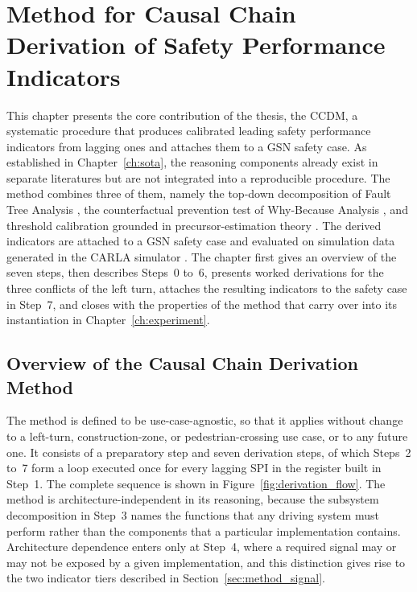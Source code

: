 \chapter[Causal Chain Derivation Method]{Method for Causal Chain Derivation of Safety Performance Indicators}
\label{ch:methodology}

This chapter presents the core contribution of the thesis, the \ac{CCDM}, a systematic
procedure that produces calibrated leading safety performance indicators
from lagging ones and attaches them to a \ac{GSN} safety case. As established in
Chapter~\ref{ch:sota}, the reasoning components already exist in separate literatures
but are not integrated into a reproducible procedure. The method combines three of
them, namely the top-down decomposition of Fault Tree Analysis \cite{iec61025}, the
counterfactual prevention test of Why-Because Analysis \cite{ladkin1998}, and
threshold calibration grounded in precursor-estimation theory \cite{bieryi1995}. The
derived indicators are attached to a \ac{GSN} safety case and evaluated on
simulation data generated in the CARLA simulator \cite{dosovitskiy2017carla}. The chapter first gives
an overview of the seven steps, then describes Steps~0 to~6, presents worked
derivations for the three conflicts of the left turn, attaches the resulting
indicators to the safety case in Step~7, and closes with the properties of the
method that carry over into its instantiation in Chapter~\ref{ch:experiment}.

\section{Overview of the Causal Chain Derivation Method}
\label{sec:method_overview}

The method is defined to be use-case-agnostic, so that it applies without change to a
left-turn, construction-zone, or pedestrian-crossing use case, or to any future one.
It consists of a preparatory step and seven derivation steps, of which
Steps~2 to~7 form a loop executed once for every lagging SPI in the register
built in Step~1. The complete sequence is shown in
Figure~\ref{fig:derivation_flow}. The method is architecture-independent in its
reasoning, because the subsystem decomposition in Step~3 names the functions that any
driving system must perform rather than the components that a particular
implementation contains. Architecture dependence enters only at Step~4, where a
required signal may or may not be exposed by a given implementation, and this
distinction gives rise to the two indicator tiers described in
Section~\ref{sec:method_signal}.

